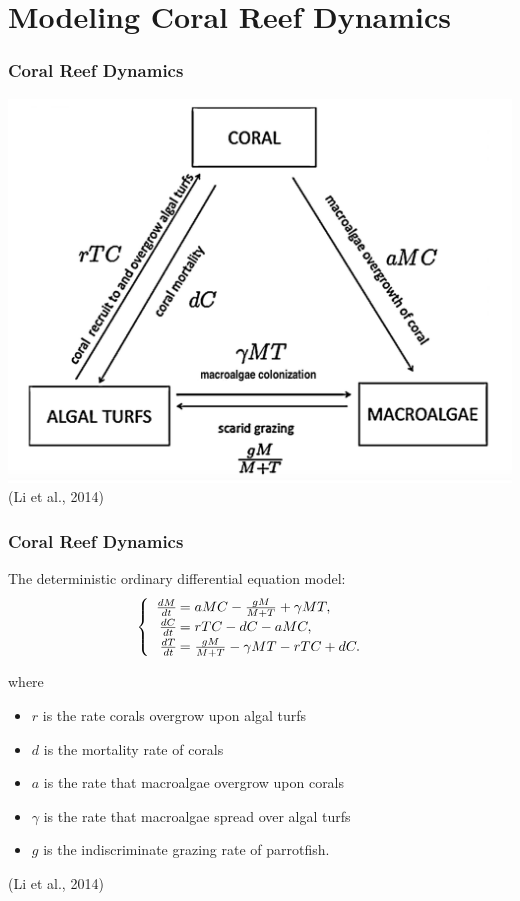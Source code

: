 \section{Modeling Coral Reef Dynamics}

\begin{frame}
\frametitle{Coral Reef Dynamics}
\includegraphics[scale=.175]{./coral-reef-triangle.png}\\(Li et al., 2014)
\end{frame}

\begin{frame}\frametitle{Coral Reef Dynamics}
The deterministic ordinary differential equation model:
$$\begin{cases}\begin{array}{rl}
\frac{dM}{dt}\hspace{-.8em}&=aMC - \frac{gM}{M+T} + \gamma M T, \\
\frac{dC}{dt}\hspace{-.8em}&=rTC - dC - aMC, \\
\frac{dT}{dt}\hspace{-.8em}&=\frac{gM}{M + T} - \gamma MT - rTC + dC. 
\end{array}\end{cases}$$ 

where 
\begin{itemize}\itemsep0pt
\item $r$ is the rate corals overgrow upon algal turfs\\
\item $d$ is the mortality rate of corals\\
\item $a$ is the rate that macroalgae overgrow upon corals\\
\item $\gamma$ is the rate that macroalgae spread over algal turfs\\
\item $g$ is the indiscriminate grazing rate of parrotfish.
\end{itemize} \vspace{1em}
(Li et al., 2014)
\end{frame}

